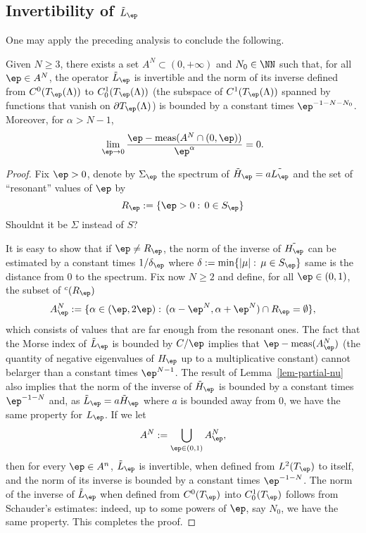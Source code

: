 \subsection{Invertibility of $\tilde L_\ep$}

One may apply the preceding analysis to conclude the following.

\begin{theorem}
Given $N\geq 3$, there exists a set $A^N\subset (0,+\infty)$ and $N_0\in \NN$
such that, for all $\ep\in A^N$, the operator $\tilde L_\ep$ is invertible and
the norm of its inverse defined from $C^0(T_\ep(\Lambda))$ to
$C_0^1(T_\ep(\Lambda))$ (the subspace of $C^1(T_\ep(\Lambda))$ spanned by
functions that vanish on $\partial T_\ep(\Lambda)$) is bounded by a constant
times $\ep^{-1-N-N_0}$. Moreover, for $\alpha>N-1$,
\[
\lim_{\ep\to 0}\frac{\ep -\operatorname{meas}(A^N\cap(0,\ep))}{\ep^\alpha} = 0.
\]
\end{theorem}

\begin{proof}
    Fix $\ep>0$, denote by $\Sigma_\ep$ the spectrum of $\tilde H_\ep =
    a\tilde{L_\ep}$ and the set of ``resonant'' values of $\ep$ by
 \[
 R_\ep:=\{\ep>0:\, 0\in S_\ep\}
 \]
 {\color{red} Shouldnt it be $\Sigma$ instead of $S$?}

 It is easy to show that if $\ep\neq R_\ep$, the norm of the inverse of
 $\tilde{H_\ep}$ can be estimated by a constant times $1/\delta_\ep$ where
 $\delta:=\min\{|\mu|:\, \mu\in S_\ep\}$ {\color{red} same} is the distance
 from 0 to the spectrum.  Fix now $N\geq 2$ and define, for all $\ep\in(0,1)$,
 the subset of ${}^c(R_\ep)$
 \begin{equation}
    A_\ep^N:=\{\alpha\in(\ep,2\ep):\, (\alpha-\ep^N,\alpha + \ep^N)\cap
    R_\ep=\emptyset\},
\end{equation}
which consists of values that are far enough from the resonant ones. The fact
that the Morse index of $\tilde L_\ep$ is bounded by $C/\ep$ implies that
$\ep-\mbox{meas}(A_\ep^N)$ (the quantity of negative eigenvalues of $H_\ep$ up
to a multiplicative constant) cannot belarger than a constant times
$\ep^{N-1}$. The result of Lemma~\ref{lem-partial-nu} also implies that the
norm of the inverse of $\tilde H_\ep$ is bounded by a constant times
$\ep^{-1-N}$ and, as $\tilde L_\ep = a\tilde H_\ep$ where $a$ is bounded away
from 0, we have the same property for $L_\ep$. If we let
\begin{equation}
    A^N:=\bigcup_{\ep\in(0,1)} A_\ep^N,
\end{equation}
then for every $\ep\in A^n$, $\tilde L_\ep$ is invertible, when defined from
$L^2(T_\ep)$ to itself, and the norm of its inverse is bounded by a constant
times $\ep^{-1-N}$. The norm of the inverse of $\tilde{L}_\ep$ when defined
from $C^0(T_\ep)$ into $C_0^1(T_\ep)$ follows from Schauder's estimates:
indeed, up to some powers of $\ep$, say $N_0$, we have the same property. This
completes the proof.
\end{proof}

